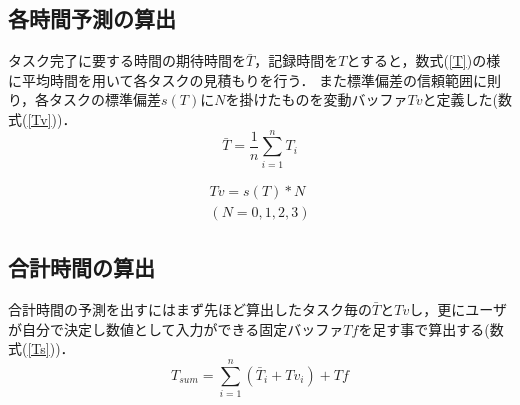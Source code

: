 \documentclass[submit,techrep,noauthor]{ipsj}
\begin{document}
\subsection{各時間予測の算出}
タスク完了に要する時間の期待時間を$\bar{T}$，記録時間を$T$とすると，数式(\ref{T})の様に平均時間を用いて各タスクの見積もりを行う．
また標準偏差の信頼範囲に則り，各タスクの標準偏差$s(T)$に$N$を掛けたものを変動バッファ$Tv$と定義した(数式(\ref{Tv}))．
\begin{equation}
\label{T}
\bar{T}=\frac{1}{n}\displaystyle\sum_{i=1}^{n}T_{i}
\end{equation}

\begin{eqnarray}
\label{Tv}
Tv=s(T)*N \\
(N= 0, 1,2, 3 )\nonumber
\end{eqnarray}

\subsection{合計時間の算出}

合計時間の予測を出すにはまず先ほど算出したタスク毎の$\bar{T}$と$Tv$し，更にユーザが自分で決定し数値として入力ができる固定バッファ$Tf$を足す事で算出する(数式(\ref{Ts}))．
\begin{equation}
\label{Ts}
T_{sum}= \displaystyle\sum_{i=1}^{n} (\bar{T}_{i} + Tv_{i})+Tf
\end{equation}
\end{document}
